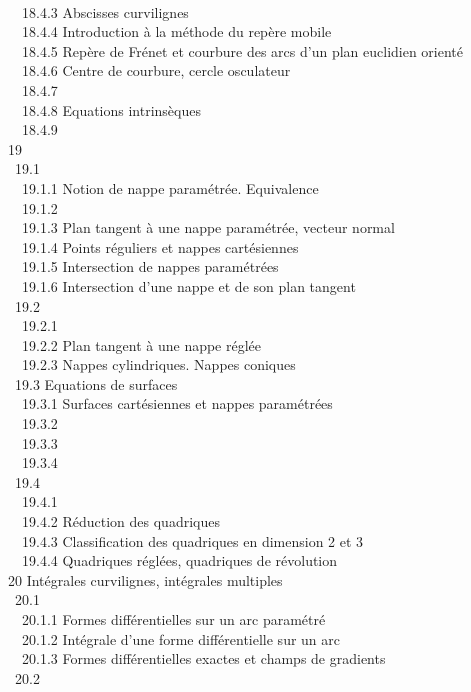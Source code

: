 \documentclass[]{article}
\begin{document}
\\ ~~18.4.3 {Abscisses
curvilignes} \\ ~~18.4.4
{Introduction à la méthode du
repère mobile} \\ ~~18.4.5
{Repère de Frénet et courbure
des arcs d'un plan euclidien orienté} \\ ~~18.4.6
{Centre de courbure, cercle
osculateur} \\ ~~18.4.7
 \\
~~18.4.8 {Equations
intrinsèques} \\ ~~18.4.9
 \\
19  \\ ~19.1
 \\ ~~19.1.1
{Notion de nappe paramétrée.
Equivalence} \\ ~~19.1.2
 \\ ~~19.1.3
{Plan tangent à une nappe
paramétrée, vecteur normal} \\ ~~19.1.4
{Points réguliers et nappes
cartésiennes} \\ ~~19.1.5
{Intersection de nappes
paramétrées} \\ ~~19.1.6
{Intersection d'une nappe et de
son plan tangent} \\ ~19.2
 \\ ~~19.2.1
 \\
~~19.2.2 {Plan tangent à une
nappe réglée} \\ ~~19.2.3
{Nappes cylindriques. Nappes
coniques} \\ ~19.3 {Equations de
surfaces} \\ ~~19.3.1 {Surfaces
cartésiennes et nappes paramétrées} \\ ~~19.3.2
 \\ ~~19.3.3
 \\ ~~19.3.4
 \\
~19.4  \\ ~~19.4.1
 \\
~~19.4.2 {Réduction des
quadriques} \\ ~~19.4.3
{Classification des quadriques
en dimension 2 et 3} \\ ~~19.4.4
{Quadriques réglées, quadriques
de révolution} \\ 20 {Intégrales
curvilignes, intégrales multiples} \\ ~20.1
 \\
~~20.1.1 {Formes
différentielles sur un arc paramétré} \\ ~~20.1.2
{Intégrale d'une forme
différentielle sur un arc} \\ ~~20.1.3
{Formes différentielles exactes
et champs de gradients} \\ ~20.2
\end{document}
